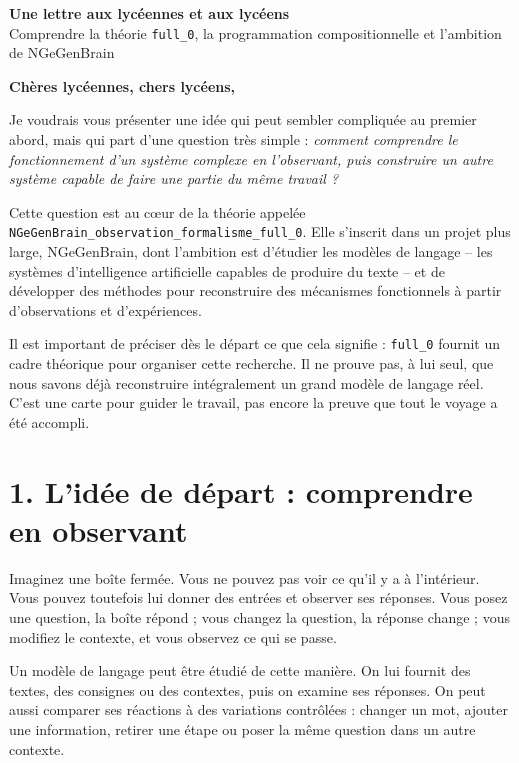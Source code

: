 \documentclass[11pt,a4paper]{article}
\begin{document}
\begin{center}
  {\Large\bfseries\color{bleuNGe} Une lettre aux lycéennes et aux lycéens}\\[0.35em]
  {\large Comprendre la théorie \texttt{full\_0}, la programmation compositionnelle et l'ambition de NGeGenBrain}
\end{center}

\vspace{0.5em}
\noindent\textbf{Chères lycéennes, chers lycéens,}

Je voudrais vous présenter une idée qui peut sembler compliquée au premier abord, mais qui part d'une question très simple : \emph{comment comprendre le fonctionnement d'un système complexe en l'observant, puis construire un autre système capable de faire une partie du même travail ?}

Cette question est au cœur de la théorie appelée \texttt{NGeGenBrain\_observation\_formalisme\_full\_0}. Elle s'inscrit dans un projet plus large, NGeGenBrain, dont l'ambition est d'étudier les modèles de langage -- les systèmes d'intelligence artificielle capables de produire du texte -- et de développer des méthodes pour reconstruire des mécanismes fonctionnels à partir d'observations et d'expériences.

Il est important de préciser dès le départ ce que cela signifie : \texttt{full\_0} fournit un cadre théorique pour organiser cette recherche. Il ne prouve pas, à lui seul, que nous savons déjà reconstruire intégralement un grand modèle de langage réel. C'est une carte pour guider le travail, pas encore la preuve que tout le voyage a été accompli.

\section*{1. L'idée de départ : comprendre en observant}

Imaginez une boîte fermée. Vous ne pouvez pas voir ce qu'il y a à l'intérieur. Vous pouvez toutefois lui donner des entrées et observer ses réponses. Vous posez une question, la boîte répond ; vous changez la question, la réponse change ; vous modifiez le contexte, et vous observez ce qui se passe.

Un modèle de langage peut être étudié de cette manière. On lui fournit des textes, des consignes ou des contextes, puis on examine ses réponses. On peut aussi comparer ses réactions à des variations contrôlées : changer un mot, ajouter une information, retirer une étape ou poser la même question dans un autre contexte.
\end{document}
